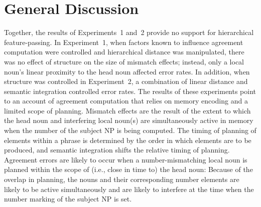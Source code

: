 \documentclass[12pt,titlepage]{article}
\newcommand{\IGNORE}[1]{} %
\begin{document}
\section[General Discussion]{\center General Discussion}

\IGNORE{---no support for hierarchical feature-passing, support for a
limited scope of planning coupled with mem encoding; in combination with
sem integ affecting planning by shifting relative timing}

Together, the results of Experiments~1 and~2 provide no support for
hierarchical feature-passing.  In Experiment~1, when factors known to
influence agreement computation were controlled and hierarchical distance
was manipulated, there was no effect of structure on the size of mismatch
effects; instead, only a local noun's linear proximity to the head noun
affected error rates.  In addition, when structure was controlled in
Experiment~2, a combination of linear distance and semantic integration
controlled error rates.  The results of these experiments point to an
account of agreement computation that relies on memory encoding and a
limited scope of planning.  Mismatch effects are the result of the extent
to which the head noun and interfering local noun(s) are simultaneously
active in memory when the number of the subject NP is being computed.  The
timing of planning of elements within a phrase is determined by the order
in which elements are to be produced, and semantic integration shifts the
relative timing of planning.  Agreement errors are likely to occur when a
number-mismatching local noun is planned within the scope of (i.e., close
in time to) the head noun: Because of the overlap in planning, the nouns
and their corresponding number elements are likely to be active
simultaneously and are likely to interfere at the time when the number
marking of the subject NP is set.

\IGNORE{\subsection{Potential Concerns over Stimulus Structure}}
\end{document}
